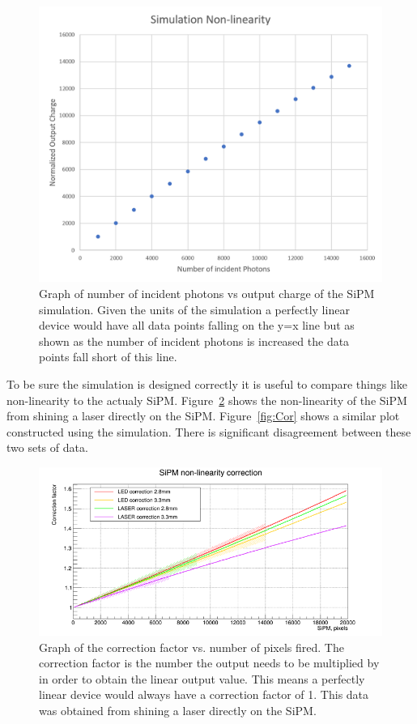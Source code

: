 \begin{figure}
\centering
\includegraphics[width=\linewidth]{Figures/SimNon.png}
\caption{Graph of number of incident photons vs output charge of the SiPM simulation. Given the units of the simulation a perfectly linear device would have all data points falling on the y=x line but as shown as the number of incident photons is increased the data points fall short of this line.}
\label{fig:SimNon}
\end{figure}

To be sure the simulation is designed correctly it is useful to compare things like non-linearity to the actualy SiPM. Figure~\ref{fig:NonLin} shows the non-linearity of the SiPM from shining a laser directly on the SiPM. Figure~\ref{fig:Cor} shows a similar plot constructed using the simulation. There is significant disagreement between these two sets of data.

\begin{figure}
\centering
\includegraphics[width=\linewidth]{Figures/LaserNonLin.png}
\caption{Graph of the correction factor vs. number of pixels fired. The correction factor is the number the output needs to be multiplied by in order to obtain the linear output value. This means a perfectly linear device would always have a correction factor of 1. This data was obtained from shining a laser directly on the SiPM.}
\label{fig:NonLin}
\end{figure}

